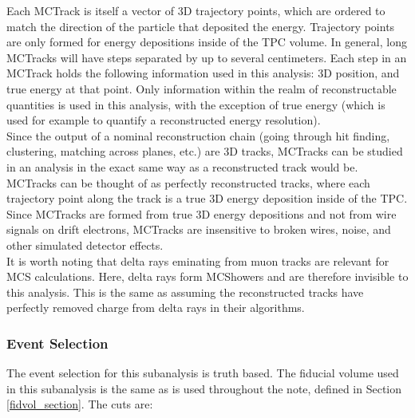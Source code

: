 Each {\sc MCTrack} is itself a vector of 3D trajectory points, which are ordered to match the direction of the particle that deposited the energy. Trajectory points are only formed for energy depositions inside of the TPC volume. In general, long {\sc MCTrack}s will have steps separated by up to several centimeters. Each step in an {\sc MCTrack} holds the following information used in this analysis: 3D position, and true energy at that point. Only information within the realm of reconstructable quantities is used in this analysis, with the exception of true energy (which is used for example to quantify a reconstructed energy resolution).\\

Since the output of a nominal reconstruction chain (going through hit finding, clustering, matching across planes, etc.) are 3D tracks, {\sc MCTracks} can be studied in an analysis in the exact same way as a reconstructed track would be. {\sc MCTracks} can be thought of as perfectly reconstructed tracks, where each trajectory point along the track is a true 3D energy deposition inside of the {\ub} TPC.\\

Since {\sc MCTracks} are formed from true 3D energy depositions and not from wire signals on drift electrons, {\sc MCTracks} are insensitive to broken wires, noise, and other simulated detector effects.\\

It is worth noting that delta rays eminating from muon tracks are relevant for MCS calculations. Here, delta rays form {\sc MCShowers} and are therefore invisible to this analysis. This is the same as assuming the reconstructed tracks have perfectly removed charge from delta rays in their algorithms.




\subsubsection{Event Selection}\label{MCBNBMCTrack_eventselection_section}
The event selection for this subanalysis is truth based. The fiducial volume used in this subanalysis is the same as is used throughout the note, defined in Section \ref{fidvol_section}. The cuts are:

